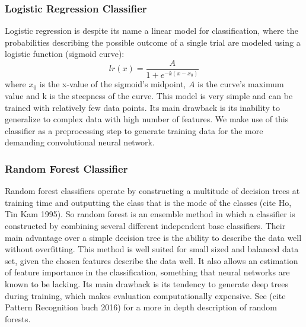 		\subsubsection{Logistic Regression Classifier}
			Logistic regression is despite its name a linear model for classification, where the probabilities describing the possible outcome of a single trial are modeled using a logistic function (sigmoid curve):
			\begin{equation}
				lr(x) = \dfrac{A}{1 + e^{-k (x-x_0)}}
			\end{equation}
		where $x_0$ is the x-value of the sigmoid's midpoint, $A$ is the curve's maximum value and k is the steepness of the curve. This model is very simple and can be trained with relatively few data points. Its main drawback is its inability to generalize to complex data with high number of features. We make use of this classifier as a preprocessing step to generate training data for the more demanding convolutional neural network. 
		
		\subsubsection{Random Forest Classifier}\label{rand_forest_class}
			Random forest classifiers operate by constructing a multitude of decision trees at training time and outputting the class that is the mode of the classes (cite Ho, Tin Kam 1995). So random forest is an ensemble method in which a classifier is constructed by combining several different independent base classifiers. Their main advantage over a simple decision tree is the ability to describe the data well without overfitting. 			
			This method is well suited for small sized and balanced data set, given the chosen features describe the data well. It also allows an estimation of feature importance in the classification, something that neural networks are known to be lacking. Its main drawback is its tendency to generate deep trees during training, which makes evaluation computationally expensive. See (cite Pattern Recognition buch 2016) for a more in depth description of random forests. 
			

